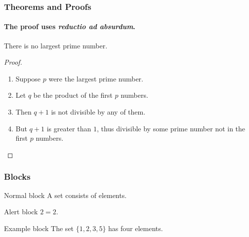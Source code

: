 \documentclass[UTF8, aspectratio=169 , 10pt，punct=kaiming]{beamer} %
\begin{document}
\begin{frame}
  \frametitle{Theorems and Proofs}
  \framesubtitle{The proof uses \textit{reductio ad absurdum}.}
  
  \begin{theorem}
    There is no largest prime number.
  \end{theorem}

  \begin{proof}
    \begin{enumerate}
      \item<1-| alert@1> Suppose $p$ were the largest prime number.
      \item<2-> Let $q$ be the product of the first $p$ numbers.
      \item<3-> Then $q+1$ is not divisible by any of them.
      \item<1-> But $q + 1$ is greater than $1$, thus divisible by some prime
      number not in the first $p$ numbers.\qedhere
    \end{enumerate}
  \end{proof}
  \end{frame}

  \begin{frame}
    \frametitle{Blocks}
  
    \begin{block}{Normal block}
  A \alert{set} consists of elements.
  \end{block}
  
  \begin{alertblock}{Alert block}
  $2=2$.
  \end{alertblock}
  
  \begin{exampleblock}{Example block}
  The set $\{1,2,3,5\}$ has four elements.
  \end{exampleblock}
  
  \end{frame}


\section{\appendixname}


\end{document}

